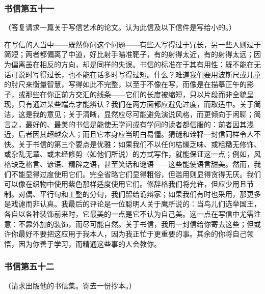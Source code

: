 
\subsubsection{书信第五十一}

（答复请求一篇关于写信艺术的论文。认为此信及以下信件是写给小的。）\par

在写信的人当中——既然你问这个问题——有些人写得过于冗长，另一些人则过于简短；两者都偏离了中道，好比射手瞄准靶子，有的射得太近，有的射得太远；因为偏离虽在相反的方向，却是同样的失误。书信的标准在于其有用性：既不能在无话可说时写得过长，也不能在话多时写得过短。什么？难道我们要用波斯尺或儿童的肘尺来衡量智慧，写得如此不完整，以至于不像在写，而像是在描摹正午的影子，或那些在你正前方交汇的线条——它们的长度被缩短，只以片段而非全貌呈现，只有通过某些端点才能辨认？我们在两方面都应避免过度，而取适中。关于简洁，这是我的意见；关于清晰，显然应尽可能避免演说风格，而更倾向于闲聊；简言之，最好的、最美的书信是能使无学问或有学问的读者都信服的：前者因其浅近，后者因其超越众人；而且它本身应当明白易懂。猜谜和诠释一封信同样令人不快。关于书信的第三个要点是优雅：如果我们不以任何枯燥乏味、或粗糙无修饰、或杂乱无章、或未经修剪（如他们所说）的方式写作，就能保证这一点；例如，风格缺乏格言、谚语、精辟之语，甚至笑话和谜语——这些能使语言甜美。然而，我们不能显得过度使用它们。完全省略它们显得粗俗，但滥用则显得贪得无厌。我们可以像在织物中使用紫色那样适度使用它们。修辞格我们将允许，但应少用且节制。对偶、平行句和工整的分句，我们留给诡辩家；如果我们有时也采用，那更多是戏谑而非认真。我最后的评论是一位聪明人关于鹰所说的：当鸟儿们选举国王，各自以各种装饰前来时，它最美的一点是它不认为自己美。这一点在写信中尤需注意：不靠外加的装饰，而尽可能自然。关于书信，我用一封信给你寄去这些；但或许你最好不要把这应用于我本人，因为我正忙于更重要的事。其余的你将自己领悟，因为你善于学习，而精通这些事的人会教你。\par


\subsubsection{书信第五十二}

（请求出版他的书信集。寄去一份抄本。）\par

